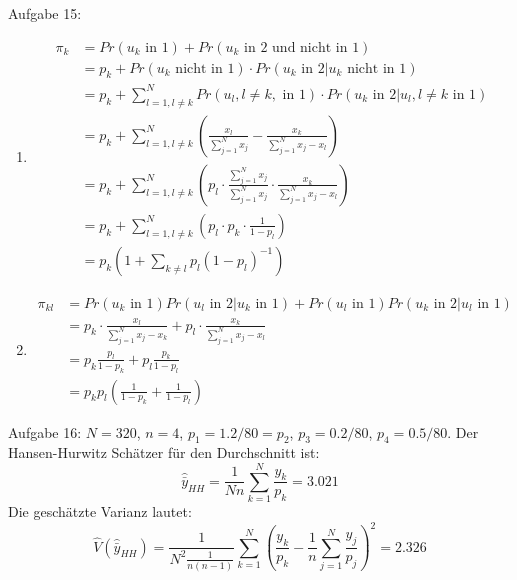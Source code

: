 \begin{Solution}{{Aufgabe 15:}}
\begin{enumerate}
	\item \begin{align*}
	\pi_k &=Pr(u_k \text{ in } 1) + Pr(u_k \text{ in 2 und nicht in }1) \\
	&= p_k +Pr(u_k \text{ nicht in 1})\cdot Pr(u_k \text{ in 2}|u_k \text{ nicht in 1})\\
	&=p_k + \sum_{l=1,l \neq k}^N Pr(u_l, l\neq k, \text{ in 1}) \cdot Pr(u_k \text{ in 2}|u_l, l \neq k \text{ in 1})\\
	&=p_k + \sum_{l=1,l\neq k}^N\left(\frac{x_l}{\sum_{j=1}^N x_j} - \frac{x_k}{\sum_{j=1}^N x_j-x_l}\right)\\
	&=p_k +\sum_{l=1,l\neq k}^N\left(p_l \cdot \frac{\sum_{j=1}^N x_j}{\sum_{j=1}^N x_j} \cdot \frac{x_k}{\sum_{j=1}^N x_j-x_l}\right)\\
	&=p_k +\sum_{l=1,l\neq k}^N \left(p_l \cdot p_k\cdot  \frac{1}{1-p_l}\right)\\
	&= p_k \left(1 + \sum_{k\neq l} p_l (1 - p_l)^{-1}  \right)
	\end{align*}
	\item \begin{align*}
	\pi_{kl} &= Pr(u_k \text{ in 1})Pr(u_l \text{ in 2}|u_k \text{ in 1}) + Pr(u_l \text{ in 1})Pr(u_k \text{ in 2}|u_l \text{ in 1})\\
	& = p_k\cdot \frac{x_l}{\sum_{j=1}^N x_j -x_k} + p_l\cdot \frac{x_k}{\sum_{j=1}^N x_j -x_l}\\
	&= p_k \frac{p_l}{1-p_k} + p_l \frac{p_k}{1-p_l}\\
	&= p_k p_l (\frac{1}{1-p_k}+\frac{1}{1-p_l})
	\end{align*}
\end{enumerate}
\end{Solution}
\begin{Solution}{{Aufgabe 16:}}
$N=320$, $n=4$, $p_1=1.2/80 = p_2$, $p_3=0.2/80$, $p_4 = 0.5/80$. Der Hansen-Hurwitz Schätzer für den Durchschnitt ist:
$$\hat{\bar{y}}_{HH}=\frac{1}{Nn}\sum_{k=1}^{N} \frac{y_k}{p_k}=3.021$$ Die geschätzte Varianz lautet:
$$\hat{V}(\hat{\bar{y}}_{HH}) = \frac{1}{N^2 \frac{1}{n(n-1)}}\sum_{k=1}^N\left(\frac{y_k}{p_k}-\frac{1}{n}\sum_{j=1}^N \frac{y_j}{p_j}\right)^2 = 2.326$$
\end{Solution}
